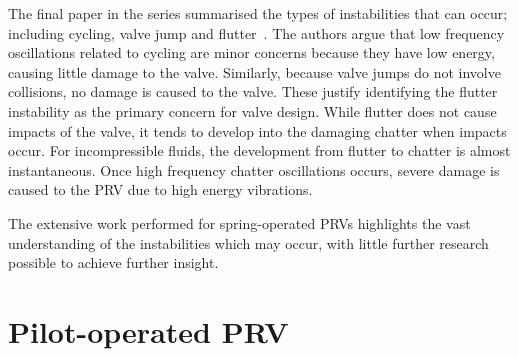 The final paper in the series summarised the types of instabilities that can occur; including cycling, valve jump and flutter~\cite{Hos2017DynamicRecommendations}.
The authors argue that low frequency oscillations related to cycling are minor concerns because they have low energy, causing little damage to the valve. Similarly, because valve jumps do not involve collisions, no damage is caused to the valve.
%
These justify identifying the flutter instability as the primary concern for valve design. While flutter does not cause impacts of the valve, it tends to develop into the damaging chatter when impacts occur. For incompressible fluids, the development from flutter to chatter is almost instantaneous. Once high frequency chatter oscillations occurs, severe damage is caused to the PRV due to high energy vibrations. %

The extensive work performed for spring-operated PRVs highlights the vast understanding of the  instabilities which may occur, with little further research possible to achieve further insight.

\section{Pilot-operated PRV}



